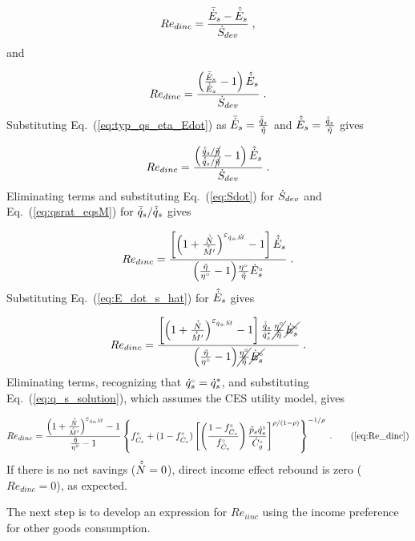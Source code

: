 \begin{equation}
  Re_{dinc} = \frac{\bar{\dot{E}}_s - \hat{\dot{E}}_s}{\dot{S}_{dev}} \; , 
\end{equation}
%
and

\begin{equation}
  Re_{dinc} = \frac{\left( \frac{\bar{\dot{E}}_s}{\hat{\dot{E}}_s} - 1  \right) \hat{\dot{E}}_s}{\dot{S}_{dev}} \; .
\end{equation}
%
Substituting Eq.~(\ref{eq:typ_qs_eta_Edot}) as
$\bar{\dot{E}}_s = \frac{\bar{\dot{q}}_s}{\tilde{\eta}}$ and  
$\hat{\dot{E}}_s = \frac{\hat{\dot{q}}_s}{\tilde{\eta}}$ gives

\begin{equation}
  Re_{dinc} = \frac{\left( \frac{\bar{\dot{q}}_s / \cancel{\tilde{\eta}}}{\hat{\dot{q}}_s / \cancel{\tilde{\eta}}} - 1  \right) \hat{\dot{E}}_s} 
              {\dot{S}_{dev}} \; .
\end{equation}
%
Eliminating terms and substituting Eq.~(\ref{eq:Sdot}) for $\dot{S}_{dev}$ and
Eq.~(\ref{eq:qsrat_eqsM}) for $\bar{\dot{q}}_s / \hat{\dot{q}}_s$ gives

\begin{equation}
  Re_{dinc} = \frac{\left[ \left( 1 + \frac{\hat{\dot{N}}}{\hat{\dot{M}}^\prime} \right) ^{\varepsilon_{\dot{q}_s\!,\dot{M}}} - 1  \right] \hat{\dot{E}}_s} 
              {\left( \frac{\tilde{\eta}}{{}{\eta}^{\scriptscriptstyle \circ}} - 1 \right)\! \frac{{}{\eta}^{\scriptscriptstyle \circ}}{\tilde{\eta}} {}{\dot{E}}^{\scriptscriptstyle \circ}_s} \; .
\end{equation}
%
Substituting Eq.~(\ref{eq:E_dot_s_hat}) for $\hat{\dot{E}}_s$ gives

\begin{equation}
  Re_{dinc} = \frac{\left[ \left( 1 + \frac{\hat{\dot{N}}}{\hat{\dot{M}}^\prime} \right) ^{\varepsilon_{\dot{q}_s\!,\dot{M}}} - 1  \right] 
                  \frac{\hat{\dot{q}}_s}{{\dot{q}}^*_s}
                \cancel{\frac{{}{\eta}^{\scriptscriptstyle \circ}}{\tilde{\eta}}}
                \cancel{{}{\dot{E}}^{\scriptscriptstyle \circ}_s}}
              {\left( \frac{\tilde{\eta}}{{}{\eta}^{\scriptscriptstyle \circ}} - 1 \right)\! 
                  \cancel{\frac{{}{\eta}^{\scriptscriptstyle \circ}}{\tilde{\eta}}} \cancel{{}{\dot{E}}^{\scriptscriptstyle \circ}_s}} \; .
\end{equation}
%
Eliminating terms, recognizing that 
${}{\dot{q}}^{\scriptscriptstyle \circ}_s = {\dot{q}}^*_s$, and substituting Eq.~(\ref{eq:q_s_solution}), 
which assumes the CES utility model,
gives

\begin{equation} 
  Re_{dinc} = \Redinceqnexact{} \; . \tag{\ref{eq:Re_dinc}}
\end{equation}
%
If there is no net savings ($\hat{\dot{N}} = 0$), 
direct income effect rebound is zero ($Re_{dinc} = 0$), as expected.

The next step is to develop an expression for $Re_{iinc}$
using the income preference for other goods consumption.



